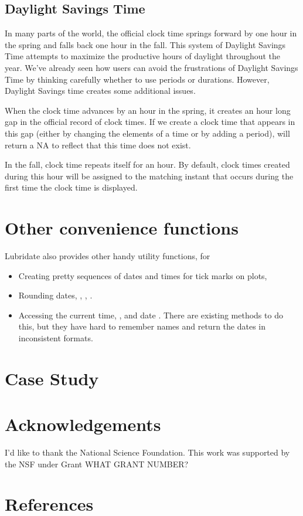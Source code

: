 \documentclass[article]{jss}
\begin{document}
\subsection{Daylight Savings Time}
\label{sec:DST}

In many parts of the world, the official clock time springs forward by one hour in the spring and falls back one hour in the fall. This system of Daylight Savings Time attempts to maximize the productive hours of daylight throughout the year. We've already seen how  users can avoid the frustrations of Daylight Savings Time by thinking carefully whether to use periods or durations. However, Daylight Savings time creates some additional issues.

When the clock time advances by an hour in the spring, it creates an hour long gap in the official record of clock times. If we create a clock time that appears in this gap (either by changing the elements of a time or by adding a period),  will return a NA to reflect that this time does not exist.

In the fall, clock time repeats itself for an hour. By default, clock times created during this hour will be assigned to the matching instant that occurs during the first time the clock time is displayed.

\section{Other convenience functions}
\label{sec:utils}

Lubridate also provides other handy utility functions, for

\begin{itemize}
  \item Creating pretty sequences of dates and times for tick marks on plots, 
  
  \item Rounding dates, , , .

  \item Accessing the current time, , and date .  There are existing methods to do this, but they have hard to remember names and return the dates in inconsistent formats.
  
\end{itemize}



\section{Case Study}

\section*{Acknowledgements}
I'd like to thank the National Science Foundation. This work was supported by the NSF under Grant WHAT GRANT NUMBER? 

\section*{References}
\end{document}
